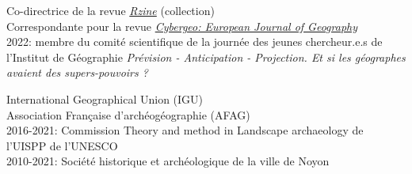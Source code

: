 
\begin{small} \color{black}
Co-directrice de la revue \href{https://rzine.fr/collection/}{\textit{Rzine}} (collection) \\
Correspondante pour la revue \href{https://journals.openedition.org/cybergeo/}{\textit{Cybergeo: European Journal of Geography}} \\
2022: membre du comité scientifique de la journée des jeunes chercheur.e.s de l’Institut de Géographie \textit{Prévision - Anticipation - Projection. Et si les géographes avaient des supers-pouvoirs ? } \\
\end{small}


\begin{small} \color{black}
International Geographical Union (IGU) \\
Association Française d'archéogéographie (AFAG) \\
2016-2021: Commission Theory and method in Landscape archaeology de l’UISPP de l’UNESCO \\
2010-2021: Société historique et archéologique de la ville de Noyon
\end{small}

